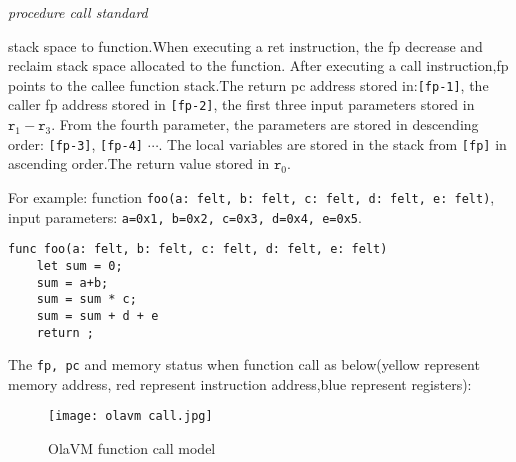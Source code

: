 \emph{procedure call standard}

stack space to function.When executing a ret instruction, the fp decrease and reclaim stack space allocated to the function.
After executing a call instruction,fp points to the callee function stack.The return pc address stored in:\texttt{[fp-1]}, the caller fp address stored in \texttt{[fp-2]}, the first three input parameters stored in $\texttt{r}_1 - \texttt{r}_{3}$.
From the fourth parameter, the parameters are stored in descending order: \texttt{[fp-3]}, \texttt{[fp-4]} $\cdots$.
The local variables are stored in the stack from \texttt{[fp]} in ascending order.The return value stored in $\texttt{r}_0$.

For example: function \texttt{foo(a: felt, b: felt, c: felt, d: felt, e: felt)}, input parameters: \texttt{a=0x1, b=0x2, c=0x3, d=0x4, e=0x5}.
\begin{lstlisting}[label={lst:function_call}]
func foo(a: felt, b: felt, c: felt, d: felt, e: felt)
    let sum = 0;
    sum = a+b;
    sum = sum * c;
    sum = sum + d + e
    return ;
\end{lstlisting}

The \texttt{fp, pc} and memory status when function call as below(yellow represent memory address, red represent instruction address,blue represent registers):
\begin{figure}[!htp]
    \centering
    \texttt{[image: olavm call.jpg]}
    \caption{OlaVM function call model}
    \label{fig:processor call}
\end{figure}
